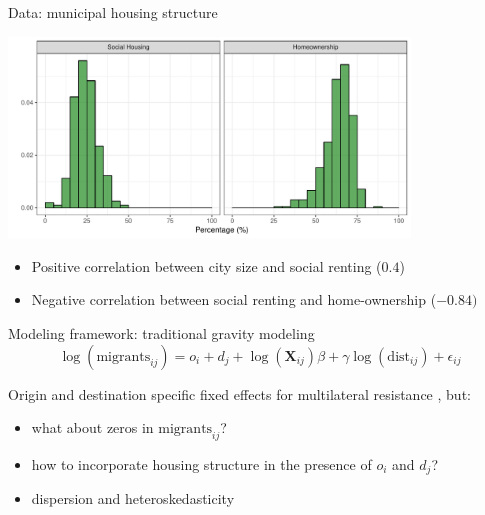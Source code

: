 \documentclass{beamer}
\begin{document}
\begin{frame}{Data: municipal housing structure}
\begin{center}
	\includegraphics[width=0.8\textwidth]{../fig/hist_housing}      
\end{center}
\begin{itemize}
	\item Positive correlation between city size and social renting ($0.4$)
	\item Negative correlation between social renting and home-ownership ($-0.84)$
\end{itemize}
\end{frame}

\begin{frame}{Modeling framework: traditional gravity modeling}
	\begin{equation*}
	\log(\text{migrants}_{ij}) = o_i + d_j +  \log(\mathbf{X}_{ij})\beta + \gamma\log(\text{dist}_{ij}) + \epsilon_{ij}
	\label{eq:gravfixed}
	\end{equation*} 
	
	Origin and destination specific \alert{fixed} effects for multilateral resistance \citep{anderson2003gravity}, but:
	\begin{itemize}
		\item what about \alert{zeros} in $\text{migrants}_{ij}$?
		\item how to incorporate \alert{housing} structure in the presence of $o_i$ and $d_j$?
		\item \alert{dispersion} and \alert{heteroskedasticity} \citep{silva2006log}
	\end{itemize}
\end{frame}
\end{document}
